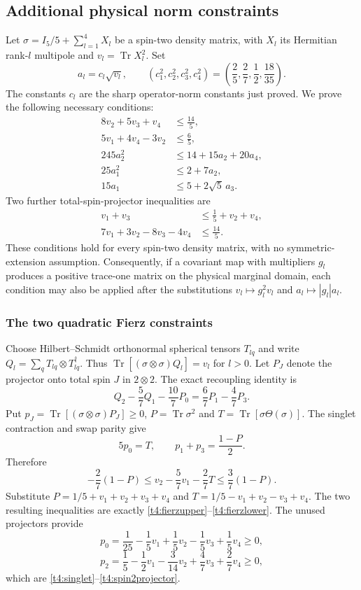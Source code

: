 \documentclass[11pt,a4paper]{article}
\newcommand{\Tr}{\operatorname{Tr}}
\begin{document}
\subsection{Additional physical norm constraints}
Let $\sigma=I_5/5+\sum_{l=1}^4X_l$ be a spin-two density matrix,
with $X_l$ its Hermitian rank-$l$ multipole and $v_l=\Tr X_l^2$.
Set
\[
 a_l=c_l\sqrt{v_l},\qquad
 (c_1^2,c_2^2,c_3^2,c_4^2)=\left(\frac25,\frac27,\frac12,\frac{18}{35}\right).
\]
The constants $c_l$ are the sharp operator-norm constants just proved.
We prove the following necessary conditions:
\begin{align}
8v_2+5v_3+v_4&\le\frac{14}{5},\label{t4:fierzupper}\\
5v_1+4v_4-3v_2&\le\frac65,\label{t4:fierzlower}\\
245a_2^2&\le14+15a_2+20a_4,\label{t4:quadrupole}\\
25a_1^2&\le2+7a_2,\label{t4:variance}\\
15a_1&\le5+2\sqrt5\,a_3.\label{t4:octupole}
\end{align}
Two further total-spin-projector inequalities are
\begin{align}
v_1+v_3&\le\frac15+v_2+v_4,\label{t4:singlet}\\
7v_1+3v_2-8v_3-4v_4&\le\frac{14}{5}.\label{t4:spin2projector}
\end{align}
These conditions hold for every spin-two density matrix, with no
symmetric-extension assumption. Consequently, if a covariant map with
multipliers $g_l$ produces a positive trace-one matrix on the physical
marginal domain, each condition may also be applied after the substitutions
$v_l\mapsto g_l^2v_l$ and $a_l\mapsto |g_l|a_l$.

\subsubsection{The two quadratic Fierz constraints}
Choose Hilbert--Schmidt orthonormal spherical tensors $T_{lq}$ and write
$Q_l=\sum_qT_{lq}\otimes T_{lq}^{\dagger}$. Thus
$\Tr[(\sigma\otimes\sigma)Q_l]=v_l$ for $l>0$.
Let $P_J$ denote the projector onto total spin $J$ in $2\otimes2$.
The exact recoupling identity is
\[
Q_2-\frac57Q_1-\frac{10}{7}P_0
 =\frac67P_1-\frac47P_3.
\]
Put $p_J=\Tr[(\sigma\otimes\sigma)P_J]\ge0$,
$P=\Tr\sigma^2$ and $T=\Tr[\sigma\Theta(\sigma)]$.
The singlet contraction and swap parity give
\[
5p_0=T,\qquad p_1+p_3=\frac{1-P}{2}.
\]
Therefore
\[
-\frac27(1-P)
\le v_2-\frac57v_1-\frac27T
\le\frac37(1-P).
\]
Substitute
$P=1/5+v_1+v_2+v_3+v_4$ and
$T=1/5-v_1+v_2-v_3+v_4$.
The two resulting inequalities are exactly
\eqref{t4:fierzupper}--\eqref{t4:fierzlower}.
The unused projectors provide
\[
p_0=\frac1{25}-\frac15v_1+\frac15v_2-\frac15v_3+\frac15v_4\ge0,
\]
\[
p_2=\frac15-\frac12v_1-\frac3{14}v_2+\frac47v_3+\frac27v_4\ge0,
\]
which are \eqref{t4:singlet}--\eqref{t4:spin2projector}.
\end{document}
